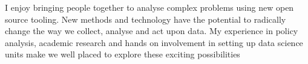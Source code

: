 \documentclass[]{deedy-resume-reversed}
\begin{document}
%
%

%
%

\vspace{6pt}


{\justifying 
\noindent I enjoy bringing people together to analyse complex problems using new open source tooling. New methods and technology have the potential to radically change the way we collect, analyse and act upon data. My experience in policy analysis, academic research and hands on involvement in setting up data science units make we well placed to explore these exciting possibilities
\par}
%
%

\vspace{5pt}
\end{document}
